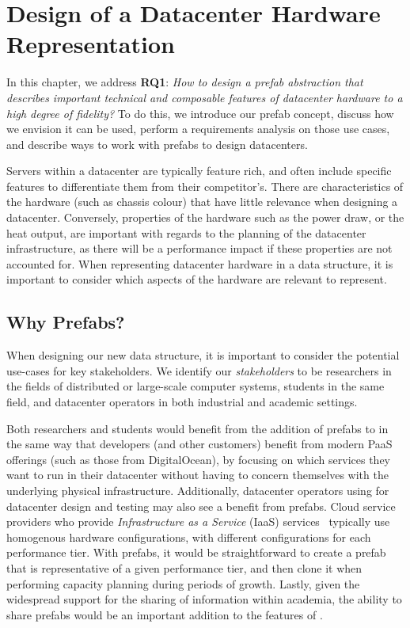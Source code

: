 \documentclass[11pt]{article}
\begin{document}
\newpage

\section{Design of a Datacenter Hardware Representation} \label{sec:design}
	In this chapter, we address \textbf{RQ1}: \textit{How to design a prefab abstraction that describes important technical and composable features of datacenter hardware to a high degree of fidelity?}
	To do this, we introduce our prefab concept, discuss how we envision it can be used, perform a requirements analysis on those use cases, and describe ways to work with prefabs to design datacenters.

	Servers within a datacenter are typically feature rich, and often include specific features to differentiate them from their competitor's.
	There are characteristics of the hardware (such as chassis colour) that have little relevance when designing a datacenter.
	Conversely, properties of the hardware such as the power draw, or the heat output, are important with regards to the planning of the datacenter infrastructure, as there will be a performance impact if these properties are not accounted for.
	When representing datacenter hardware in a data structure, it is important to consider which aspects of the hardware are relevant to represent.
	
	\subsection{Why Prefabs?} \label{sec:whyprefabs}
		When designing our new data structure, it is important to consider the potential use-cases for key stakeholders.
		We identify our \textit{stakeholders} to be researchers in the fields of distributed or large-scale computer systems, students in the same field, and datacenter operators in both industrial and academic settings.

		Both researchers and students would benefit from the addition of prefabs to \opendc{} in the same way that developers (and other customers) benefit from modern PaaS offerings (such as those from DigitalOcean), by focusing on which services they want to run in their datacenter without having to concern themselves with the underlying physical infrastructure.
		Additionally, datacenter operators using \opendc{} for datacenter design and testing may also see a benefit from prefabs. 
		Cloud service providers who provide \textit{Infrastructure as a Service} (IaaS) services~\cite{Liu2011} typically use homogenous hardware configurations, with different configurations for each performance tier. 
		With prefabs, it would be straightforward to create a prefab that is representative of a given performance tier, and then clone it when performing capacity planning during periods of growth.
		Lastly, given the widespread support for the sharing of information within academia, the ability to share prefabs would be an important addition to the features of \opendc{}.
\end{document}
